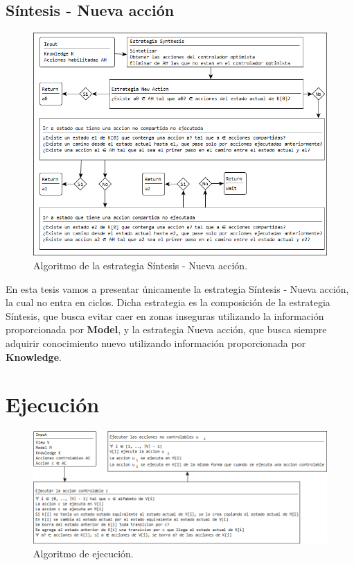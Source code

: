 \subsection{Síntesis - Nueva acción}

\begin{figure}[H]
  \centering
    \includegraphics[width=1.0\textwidth]{Imagenes/Algoritmo/Algoritmo_elegir_2.png}
  \caption{Algoritmo de la estrategia Síntesis - Nueva acción.}
  \label{fig:Algoritmo_elegir_2}
\end{figure}

En esta tesis vamos a presentar únicamente la estrategia Síntesis - Nueva acción, la cual no entra en ciclos. Dicha estrategia es la composición de la estrategia
Síntesis, que busca evitar caer en zonas inseguras utilizando la información proporcionada por \textbf{Model}, y la estrategia Nueva acción, que busca siempre
adquirir conocimiento nuevo utilizando información proporcionada por \textbf{Knowledge}.

\section{Ejecución}

\begin{figure}[H]
  \centering
    \includegraphics[width=1.0\textwidth]{Imagenes/Algoritmo/Algoritmo_ejecutar.png}
  \caption{Algoritmo de ejecución.}
  \label{fig:Algoritmo_ejecutar}
\end{figure}

